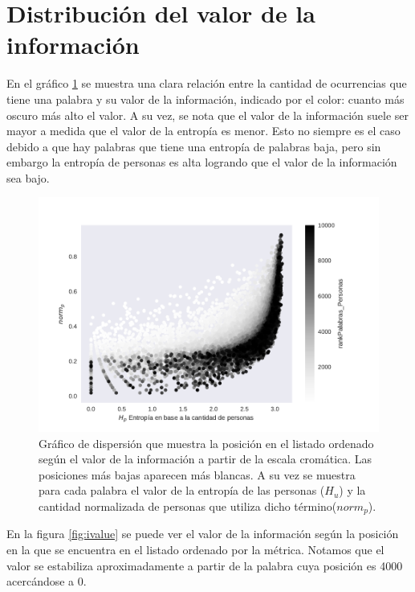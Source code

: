 \section{Distribución del valor de la información}
\label{sec:ValorDeLaInformacion}
En el gráfico \ref{fig:infoValue} se muestra una clara relación entre la cantidad de ocurrencias que tiene una palabra y su valor de la información, indicado por el color: cuanto más oscuro más alto el valor. A su vez, se nota que el valor de la información suele ser mayor a medida que el valor de la entropía es menor. Esto no siempre es el caso debido a que hay palabras que tiene una entropía de palabras baja, pero sin embargo la entropía de personas es alta logrando que el valor de la información sea bajo.

\begin{figure}[ht]
\centering
\includegraphics[width=1.0\textwidth]{./images/entropiaPersonasxNormCantPersonas.pdf}
\caption{Gráfico de dispersión que muestra la posición en el listado ordenado según el valor de la información a partir de la escala cromática. Las posiciones más bajas aparecen más blancas. A su vez se muestra para cada palabra el valor de la entropía de las personas ($H_u$) y la cantidad normalizada de personas que utiliza dicho término($norm_p$). } 
\label{fig:infoValue} 
\end{figure}

En la figura \ref{fig:ivalue} se puede ver el valor de la información según la posición en la que se encuentra en el listado ordenado por la métrica. Notamos que el valor se estabiliza aproximadamente a partir de la palabra cuya posición es 4000 acercándose a 0.



